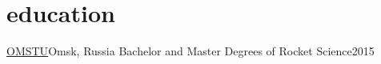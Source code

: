 \section{education}
  \resumeSubHeadingListStart

    \resumeSubheading
      {\href{https://omgtu.ru/}{OMSTU}}{Omsk, Russia}
      {Bachelor and Master Degrees of Rocket Science}{2015}

  \resumeSubHeadingListEnd